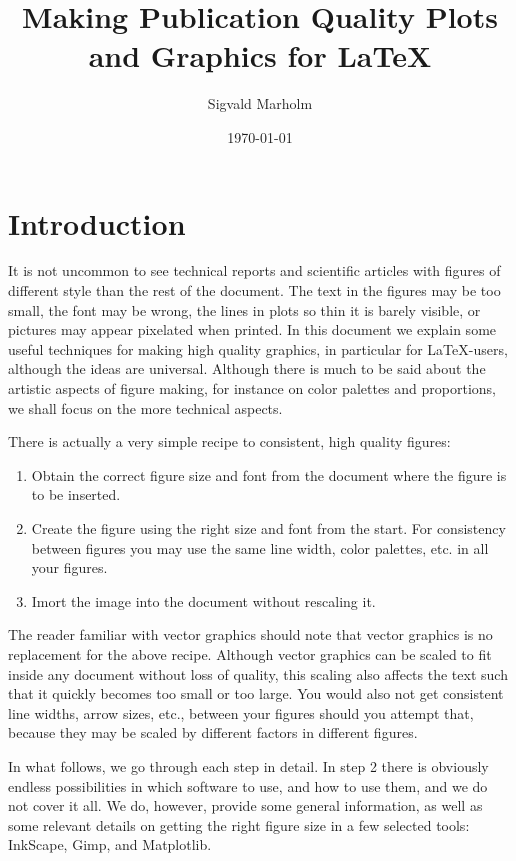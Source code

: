 \documentclass[12pt,a4paper]{article}
\title{Making Publication Quality Plots and Graphics for \LaTeX}
\author{Sigvald Marholm}
\date{\today}
\begin{document}
\maketitle
\pagebreak

\setcounter{section}{-1}
\section{Introduction}
It is not uncommon to see technical reports and scientific articles with figures of different style than the rest of the document.
The text in the figures may be too small, the font may be wrong, the lines in plots so thin it is barely visible, or pictures may appear pixelated when printed.
In this document we explain some useful techniques for making high quality graphics, in particular for \LaTeX-users, although the ideas are universal.
Although there is much to be said about the artistic aspects of figure making, for instance on color palettes and proportions, we shall focus on the more technical aspects.

There is actually a very simple recipe to consistent, high quality figures:
\begin{enumerate}
    \item Obtain the correct figure size and font from the document where the figure is to be inserted.
    \item Create the figure using the right size and font from the start. For consistency between figures you may use the same line width, color palettes, etc. in all your figures.
    \item Imort the image into the document without rescaling it.
\end{enumerate}
The reader familiar with vector graphics should note that vector graphics is no replacement for the above recipe.
Although vector graphics can be scaled to fit inside any document without loss of quality, this scaling also affects the text such that it quickly becomes too small or too large.
You would also not get consistent line widths, arrow sizes, etc., between your figures should you attempt that, because they may be scaled by different factors in different figures.

In what follows, we go through each step in detail.
In step 2 there is obviously endless possibilities in which software to use, and how to use them, and we do not cover it all.
We do, however, provide some general information, as well as some relevant details on getting the right figure size in a few selected tools: InkScape, Gimp, and Matplotlib.
\end{document}
